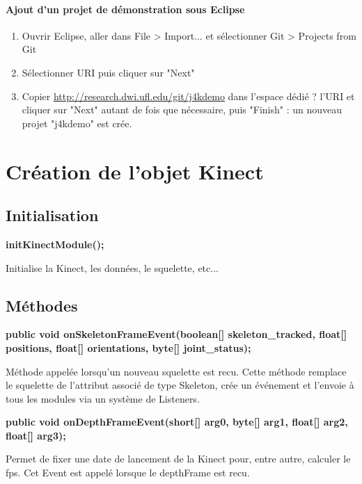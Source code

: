 \documentclass{report}
\begin{document}
\subsubsection*{Ajout d'un projet de d\'emonstration sous Eclipse}
\begin{enumerate}
\item Ouvrir Eclipse, aller dans File > Import... et s\'electionner Git > Projects from Git
\item S\'electionner URI puis cliquer sur "Next"
\item Copier \underline{http://research.dwi.ufl.edu/git/j4kdemo} dans l'espace d\'edi\'e ? l'URI et cliquer sur "Next" autant de fois que n\'ecessaire, puis "Finish" : un nouveau projet "j4kdemo" est cr\'ee.
\end{enumerate}



\chapter*{Cr\'eation de l'objet Kinect}
\section*{Initialisation}
\textbf{initKinectModule();}

Initialise la Kinect, les donn\'ees, le squelette, etc...


\section*{M\'ethodes}
\textbf{public void onSkeletonFrameEvent(boolean[] skeleton\_tracked, float[] positions, float[] orientations, byte[] joint\_status);}

M\'ethode appel\'ee lorsqu'un nouveau squelette est recu. Cette m\'ethode remplace le squelette de l'attribut associ\'e de type Skeleton, cr\'ee un \'ev\'enement et l'envoie \`a tous les modules via un syst\`eme de Listeners.


\hspace{1\baselineskip}

\textbf{public void onDepthFrameEvent(short[] arg0, byte[] arg1, float[] arg2, float[] arg3);}

Permet de fixer une date de lancement de la Kinect pour, entre autre, calculer le fps. Cet Event est appel\'e lorsque le depthFrame est recu.
      
      
\hspace{1\baselineskip}
\end{document}
